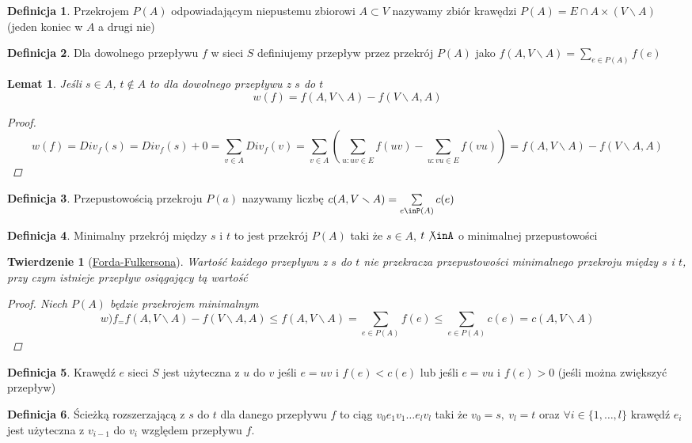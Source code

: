 \documentclass[12pt,a4paper]{article}
\newtheorem{lemat}{Lemat}
\newtheorem{tw}{Twierdzenie}
\theoremstyle{definition}
\newtheorem{df}{Definicja}
\begin{document}
\begin{df}
Przekrojem $P(A)$ odpowiadającym niepustemu zbiorowi $A\subset V$ nazywamy zbiór krawędzi $P(A) = E \cap A \times (V \smallsetminus A)$ (jeden koniec w $A$ a drugi nie)
\end{df}

\begin{df}
Dla dowolnego przepływu $f$ w sieci $S$ definiujemy przepływ przez przekrój $P(A)$ jako $f(A, V\smallsetminus A) = \sum\limits_{e\in P(A)}f(e)$
\end{df}


\begin{lemat}
Jeśli $s\in A$, $t\not\in A$ to dla dowolnego przepływu z $s$ do $t$ 
$$w(f) = f(A,V\smallsetminus A) - f(V\smallsetminus A, A)$$
\begin{proof}
$$w(f) = Div_f(s) = Div_f(s) + 0 = 
\sum\limits_{v\in A} Div_f(v) 
= \sum\limits_{v\in A}\left(\sum\limits_{u: uv\in E}f(uv) - \sum\limits_{u: vu\in E}f(vu)\right)
= f(A, V\smallsetminus A ) - f(V\smallsetminus A, A)$$
\end{proof}
\end{lemat}

\begin{df}
Przepustowością przekroju $P(a)$ nazywamy liczbę $c(A, V\smallsetminus A) = \sum\limits_{e\inP(A)} c(e)$
\end{df}

\begin{df}
Minimalny przekrój między $s$ i $t$ to jest przekrój $P(A)$ taki że $s\in A$, $t\not\inA$ o minimalnej przepustowości
\end{df}

\begin{tw}[\href{http://pl.wikipedia.org/wiki/Metoda_Forda-Fulkersona}{Forda-Fulkersona}]
Wartość każdego przepływu z $s$ do $t$ nie przekracza przepustowości minimalnego przekroju między $s$ i $t$, przy czym istnieje przepływ osiągający tą wartość
\begin{proof}
Niech $P(A)$ będzie przekrojem minimalnym 
$$w)f_ = f(A, V\smallsetminus A) - f(V\smallsetminus A, A) \leqslant f(A, V\smallsetminus A) = \sum\limits_{e\in P(A)} f(e) \leqslant \sum\limits_{e\in P(A)} c(e) = c(A, V\smallsetminus A) $$
\end{proof}
\end{tw}

\begin{df}
Krawędź $e$ sieci $S$ jest użyteczna z $u$ do $v$ jeśli $e=uv$ i $f(e) < c(e)$ lub jeśli $e=vu$ i $f(e) > 0$ (jeśli można zwiększyć przepływ)
\end{df}

\begin{df} 
Ścieżką rozszerzającą z $s$ do $t$ dla danego przepływu $f$ to ciąg $v_0e_1v_1\dots e_lv_l$ taki że $v_0 = s, ~ v_l=t$ oraz $\forall i\in \{1,\dots , l\}$ krawędź $e_i$ jest użyteczna z $v_{i-1}$ do $v_i$ względem przepływu $f$.
\end{df}
\end{document}
